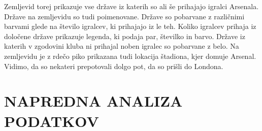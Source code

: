 \documentclass[11pt,a4paper]{article}
\begin{document}
Zemljevid torej prikazuje vse države iz katerih so ali še prihajajo igralci Arsenala. Države na zemljevidu so tudi poimenovane. Države so pobarvane z različnimi barvami glede na število igralcev, ki prihajajo iz le teh. Koliko igralcev prihaja iz določene države prikazuje legenda, ki podaja par, številko in barvo. Države iz katerih v zgodovini kluba ni prihajal noben igralec so pobarvane z belo. Na zemljevidu je z rdečo piko prikazana tudi lokacija štadiona, kjer domuje Arsenal. Vidimo, da so nekateri prepotovali dolgo pot, da so prišli do Londona.



\section{NAPREDNA ANALIZA PODATKOV}
\end{document}
